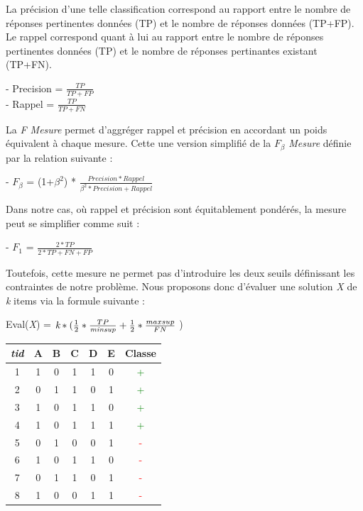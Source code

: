 \documentclass[a4paper,10pt]{report}
\begin{document}
La précision d'une telle classification correspond au rapport entre le nombre de réponses pertinentes données (TP) et le nombre de réponses données (TP+FP). Le rappel correspond quant à lui au rapport entre le nombre de réponses pertinentes données (TP) et le nombre de réponses pertinantes existant (TP+FN). 

\begin{center}
- Precision = $\frac{TP}{TP+FP}$ \\
\vspace{0.15cm}
- Rappel = $\frac{TP}{TP+FN}$\\
\end{center}

La \emph{F Mesure} permet d'aggréger rappel et précision en accordant un poids équivalent à chaque mesure. Cette une version simplifié de la \emph{$F_{\beta}$ Mesure} définie par la relation suivante : 
\begin{center}
- \emph{$F_{\beta}$} = (1+$\beta^{2}$) * $\frac{Precision*Rappel}{\beta^{2}*Precision + Rappel}$
\end{center}

Dans notre cas, où rappel et précision sont équitablement pondérés, la mesure peut se simplifier comme suit :

\begin{center}
- \emph{$F_{1}$} = $\frac{2*TP}{2*TP + FN + FP }$
\end{center}

Toutefois, cette mesure ne permet pas d'introduire les deux seuils définissant les contraintes de notre problème. Nous proposons donc d'évaluer une solution \emph{X} de \emph{k} items via la formule suivante :

\begin{center}
	Eval(\emph{X}) = $\emph{k}* ( \frac{1}{2}*\frac{TP}{\emph{minsup}} + \frac{1}{2}*\frac{maxsup}{FN}$ )\\
\end{center}
\begin{center}
	\begin{tabular}{|c|c|c|c|c|c|c|}
		\hline
		\emph{tid} & A & B & C & D & E & Classe \\
		\hline
		1 & 1 & 0 & 1 & 1 & 0 & \textcolor{green}{+}\\
		\hline
		2 & 0 & 1 & 1 & 0 & 1 & \textcolor{green}{+}\\
		\hline
		3 & 1 & 0 & 1 & 1 & 0 & \textcolor{green}{+}\\
		\hline
		4 & 1 & 0 & 1 & 1 & 1 & \textcolor{green}{+}\\
		\hline
		5 & 0 & 1 & 0 & 0 & 1 & \textcolor{red}{-}\\
		\hline
		6 & 1 & 0 & 1 & 1 & 0 & \textcolor{red}{-}\\
		\hline
		7 & 0 & 1 & 1 & 0 & 1 & \textcolor{red}{-}\\	
		\hline
		8 & 1 & 0 & 0 & 1 & 1 & \textcolor{red}{-}\\	
		\hline		
	\end{tabular}
\end{center}
\end{document}
